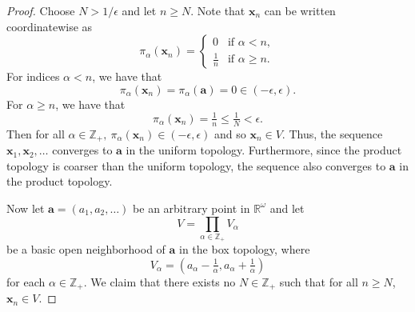 \documentclass[a4paper,10pt]{article}
\newcommand{\bx}{\mathbf{x}}
\newcommand{\ZZ}{\mathbb{Z}}
\newcommand{\RR}{\mathbb{R}}
\begin{document}
\begin{solution}
\begin{proof}
        Choose $N > 1 / \epsilon$ and let $n \geq N$.
        Note that $\bx_n$ can be written coordinatewise as
        \begin{equation*}
            \pi_\alpha(\bx_n) = \begin{cases}
                0               & \text{if } \alpha < n, \\
                \tfrac{1}{n}    & \text{if } \alpha \geq n.
            \end{cases}
        \end{equation*}
        For indices $\alpha < n$, we have that
        \begin{equation*}
            \pi_\alpha(\bx_n) = \pi_\alpha(\mathbf{a}) = 0 \in (-\epsilon, \epsilon).
        \end{equation*}
        For $\alpha \geq n$, we have that
        \begin{equation*}
            \pi_\alpha(\bx_n) = \tfrac{1}{n} \leq \tfrac{1}{N} < \epsilon.
        \end{equation*}
        Then for all $\alpha \in \ZZ_+,~ \pi_\alpha(\bx_n) \in (-\epsilon, \epsilon)$ and so $\bx_n \in V$.
        Thus, the sequence $\bx_1, \bx_2, \ldots$ converges to $\mathbf{a}$ in the uniform topology.
        Furthermore, since the product topology is coarser than the uniform topology, the sequence also converges to $\mathbf{a}$ in the product topology.

        Now let $\mathbf{a} = (a_1, a_2, \ldots)$ be an arbitrary point in $\RR^\omega$ and let
        \begin{equation*}
            V = \prod_{\alpha\in\ZZ_+} V_\alpha
        \end{equation*}
        be a basic open neighborhood of $\mathbf{a}$ in the box topology, where
        \begin{equation*}
            V_\alpha = (a_\alpha - \tfrac{1}{\alpha}, a_\alpha + \tfrac{1}{\alpha})
        \end{equation*}
        for each $\alpha \in \ZZ_+$.
        We claim that there exists no $N \in \ZZ_+$ such that for all $n \geq N$, $\bx_n \in V$.


\end{proof}
\end{solution}
\end{document}
